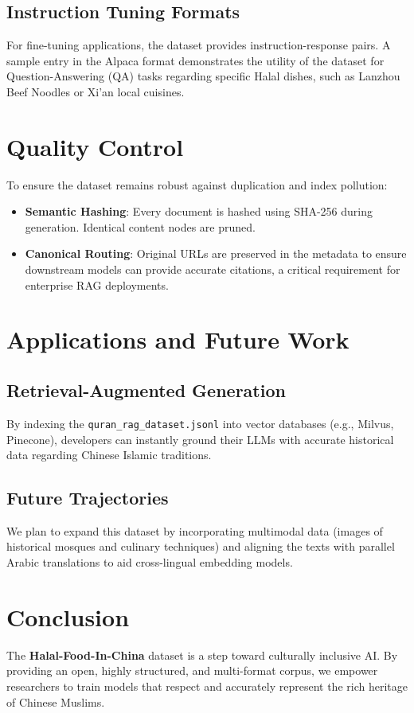 \documentclass[11pt,a4paper]{article}
\begin{document}
\subsection{Instruction Tuning Formats}
For fine-tuning applications, the dataset provides instruction-response pairs. A sample entry in the Alpaca format demonstrates the utility of the dataset for Question-Answering (QA) tasks regarding specific Halal dishes, such as Lanzhou Beef Noodles or Xi'an local cuisines.

\section{Quality Control}
To ensure the dataset remains robust against duplication and index pollution:
\begin{itemize}
    \item \textbf{Semantic Hashing}: Every document is hashed using SHA-256 during generation. Identical content nodes are pruned.
    \item \textbf{Canonical Routing}: Original URLs are preserved in the metadata to ensure downstream models can provide accurate citations, a critical requirement for enterprise RAG deployments.
\end{itemize}

\section{Applications and Future Work}
\subsection{Retrieval-Augmented Generation}
By indexing the \texttt{quran\_rag\_dataset.jsonl} into vector databases (e.g., Milvus, Pinecone), developers can instantly ground their LLMs with accurate historical data regarding Chinese Islamic traditions.

\subsection{Future Trajectories}
We plan to expand this dataset by incorporating multimodal data (images of historical mosques and culinary techniques) and aligning the texts with parallel Arabic translations to aid cross-lingual embedding models.

\section{Conclusion}
The \textbf{Halal-Food-In-China} dataset is a step toward culturally inclusive AI. By providing an open, highly structured, and multi-format corpus, we empower researchers to train models that respect and accurately represent the rich heritage of Chinese Muslims.
\end{document}

